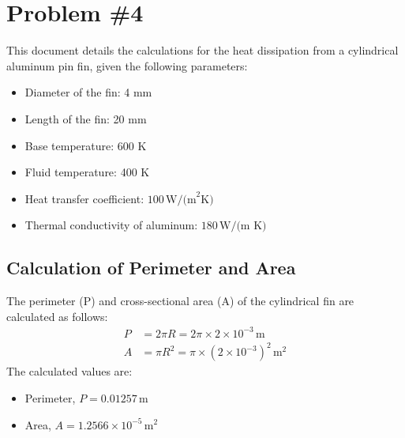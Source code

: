 \documentclass{article}
\begin{document}
\section*{Problem \#4}
This document details the calculations for the heat dissipation from a cylindrical aluminum pin fin, given the following parameters:
\begin{itemize}
    \item Diameter of the fin: 4 mm
    \item Length of the fin: 20 mm
    \item Base temperature: 600 K
    \item Fluid temperature: 400 K
    \item Heat transfer coefficient: $100 \, \text{W/(m}^2\text{K)}$
    \item Thermal conductivity of aluminum: $180 \, \text{W/(m K)}$
\end{itemize}

\begin{center}
\end{center}

\subsection*{Calculation of Perimeter and Area}
The perimeter (P) and cross-sectional area (A) of the cylindrical fin are calculated as follows:
\begin{align}
    P &= 2\pi R = 2\pi \times 2 \times 10^{-3} \, \text{m} \\
    A &= \pi R^2 = \pi \times (2 \times 10^{-3})^2 \, \text{m}^2
\end{align}
The calculated values are:
\begin{itemize}
    \item Perimeter, $P = 0.01257 \, \text{m}$
    \item Area, $A = 1.2566 \times 10^{-5} \, \text{m}^2$
\end{itemize}
\end{document}

